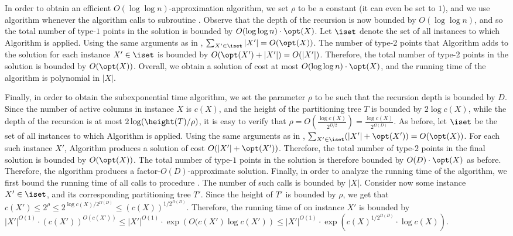 \documentclass{toc}
\begin{document}
In order to obtain an efficient $O(\log\log n)$-approximation algorithm, we set $\rho$ to be a constant (it can even be set to $1$), and we use  algorithm \leafBST whenever the algorithm calls to subroutine \leafBST. Observe that the depth of the recursion is now bounded by $O(\log\log n)$, and so the total number of type-$1$ points in the solution is bounded by $O(\log\log n)\cdot \opt(X)$. Let $\iset$ denote the set of all instances to which Algorithm \leafBST is applied. Using the same arguments as in , $\sum_{X'\in \iset}|X'|=O(\opt(X))$. The number of type-2 points that Algorithm \leafBST adds to the solution for each instance $X'\in \iset$ is bounded by $O(\opt(X') + |X'|)=O(|X'|)$. Therefore, the total number of type-2 points in the solution is bounded by $O(\opt(X))$. Overall, we obtain a solution of cost at most $O(\log\log n)\cdot \opt(X)$, and the running time of the algorithm is polynomial in $|X|$.


Finally, in order to obtain the subexponential time algorithm, we set the parameter $\rho$ to be such that the recursion depth is bounded by $D$. 
Since the number of active columns in instance $X$ is $c(X)$, and the height of the partitioning tree $T$ is bounded by $2\log c(X)$, while the depth of the recursion is at most $2\log(\height(T)/\rho)$, it is easy to verify that $\rho=O\left (\frac{\log c(X)}{2^{D/2}}\right )=\frac{\log c(X)}{2^{\Omega(D)}}$.  As before, let $\iset$ be the set of all instances to which Algorithm \leafBST is applied.
 Using the same arguments as in , $\sum_{X'\in \iset}(|X'|+\opt(X'))=O(\opt(X))$. For each such instance $X'$, Algorithm \leafBST produces a solution of cost $O(|X'|+\opt(X'))$. Therefore, the total number of type-$2$ points in the final solution is bounded by $O(\opt(X))$. The total number of type-$1$ points  in the solution is therefore bounded by $O(D)\cdot \opt(X)$ as before. Therefore, the algorithm produces a factor-$O(D)$-approximate solution. Finally, in order to analyze the running time of the algorithm, we first bound the running time of all calls to procedure \leafBST. The number of such calls is bounded by $|X|$. Consider now some instance $X'\in \iset$, and its corresponding partitioning tree $T'$. Since the height of $T'$ is bounded by $\rho$, we get that $c(X')\leq 2^{\rho}\leq 2^{\log c(X)/2^{\Omega(D)}}\leq (c(X))^{1/2^{\Omega(D)}}$. 
 Therefore, the running time of \leafBST on instance $X'$ is bounded by $|X'|^{O(1)}\cdot (c(X'))^{O(c(X'))}\leq |X'|^{O(1)}\cdot \exp\left({O(c(X')\log c(X')}\right )\leq |X'|^{O(1)}\cdot \exp\left({c(X)^{1/2^{\Omega(D)}}\cdot \log c(X)}\right )$.
 
\end{document}

